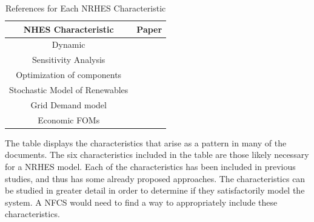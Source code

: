 \documentclass[12pt]{UIdahoMastersThesis}
\begin{document}
\begin{table}[h!]
\centering
\caption{References for Each NRHES Characteristic}
\begin{tabular}{ ||c | c|| }
 \hline
 NHES Characteristic & Paper \\ [0.5ex]
 \hline \hline
 Dynamic & \cite{Garcia2013, Du2014, Kazimi, Garcia2016}\\
 \hline
 Sensitivity Analysis & \cite{Shropshire2011, Rehman2010, Adaramola2014, Chen2016}\\
 \hline
 Optimization of components & \cite{Chen2016,Ozcan2016, Forsberg2009,Garcia2015,Aumeier2011}\\
 \hline
 Stochastic Model of Renewables & \cite{Rabiti2015, Garcia2016,Locatelli2015}\\
 \hline
 Grid Demand model & \cite{Forsberg2013, Garcia2016,Garcia2013,Ruth2014,Chen2016}\\
 \hline
  Economic FOMs & \cite{Garcia2016,Chen2016,Rabiti2015,Epiney2016,Bragg-Sitton2014}\\
 \hline
\end{tabular}
\label{table:1}
\end{table}

The table displays the characteristics that arise as a pattern in many of the documents.  The six characteristics included in the table are those likely necessary for a NRHES model.  Each of the characteristics has been included in previous studies, and thus has some already proposed approaches.  The characteristics can be studied in greater detail in order to determine if they satisfactorily model the system. A NFCS would need to find a way to appropriately include these characteristics.
\end{document}
